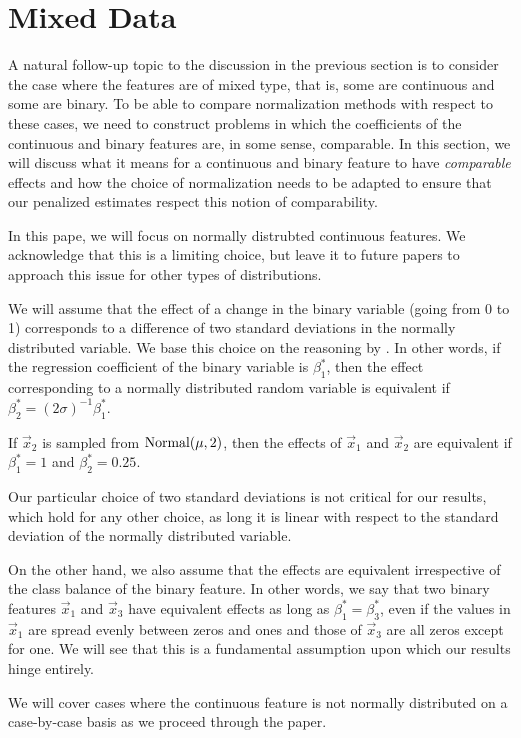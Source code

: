 \section{Mixed Data}
\label{sec:mixed-data}

A natural follow-up topic to the discussion in the previous section is to consider the case where the features are of mixed type, that is, some are continuous and some are binary.
To be able to compare normalization methods with respect to these cases, we need to construct problems in which the coefficients of the continuous and binary features are, in some sense, comparable.
In this section, we will discuss what it means for a continuous and binary feature to have \emph{comparable} effects and how the choice of normalization needs to be adapted to ensure that our penalized estimates respect this notion of comparability.

In this pape, we will focus on normally distrubted continuous features. We acknowledge that this is a limiting choice, but leave it to future papers to approach this issue for other types of distributions.

We will assume that the effect of a change in the binary variable (going from 0 to 1) corresponds to a difference of two standard deviations in the normally distributed variable. We base this choice on the reasoning by \citet{gelman2008}. In other words, if the regression coefficient of the binary variable is \(\beta^*_1\), then the effect corresponding to a normally distributed random variable is equivalent if \(\beta^*_2 = (2\sigma)^{-1} \beta_1^*\).

\begin{example}
  If \(\vec{x}_2\) is sampled from \(\operatorname{Normal}(\mu, 2)\), then the effects of \(\vec{x}_1\) and \(\vec{x}_2\) are equivalent if \(\beta_1^* = 1\) and \(\beta_2^* = 0.25\).
\end{example}

Our particular choice of two standard deviations is not critical for our results, which hold for any other choice, as long it is linear with respect to the standard deviation of the normally distributed variable.

On the other hand, we also assume that the effects are equivalent irrespective of the class balance of the binary feature. In other words, we say that two binary features \(\vec{x}_1\) and \(\vec{x}_3\) have equivalent effects as long as \(\beta_1^* = \beta_3^*\), even if the values in \(\vec{x}_1\) are spread evenly between zeros and ones and those of \(\vec{x}_3\) are all zeros except for one. We will see that this is a fundamental assumption upon which our results hinge entirely.

We will cover cases where the continuous feature is not normally distributed on a case-by-case basis as we proceed through the paper.


